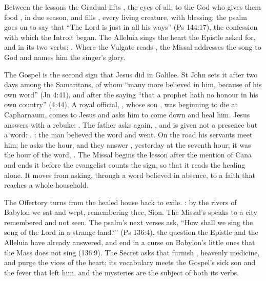Between the lessons the Gradual lifts , the eyes of all,
to the God who gives them
food , in due season, and fills , every living creature, with blessing; the psalm goes on to say that
``The Lord is just in all his ways'' (Ps 144:17), the confession with which the
Introit began. The Alleluia sings the heart the Epistle asked for, and in its
two verbs: . Where the Vulgate reads , the
Missal addresses the song to God and names him the singer's glory.

The Gospel is the second sign that Jesus did in Galilee. St John sets it after
two days among the Samaritans, of whom ``many more believed in him, because of
his own word'' (Jn 4:41), and after the saying ``that a prophet hath no honour
in his own country'' (4:44). A royal official, , whose son
, was beginning to die at Capharnaum, comes to Jesus and
asks him to come down and heal him. Jesus answers with a rebuke:
. The
father asks again, , and
is given not a presence but a word: .
: the man believed
the word and went. On the road his servants meet him; he asks the hour, and
they answer , yesterday at the seventh hour; it was
the hour of the word, . The Missal
begins the lesson after the mention of Cana and ends it before the evangelist
counts the sign, so that it reads the healing alone. It moves from asking, through a word believed in absence, to a faith that reaches
a whole household.

The Offertory turns from the healed house back to exile. : by the rivers
of Babylon we sat and wept, remembering thee, Sion. The Missal's 
speaks to a city remembered and not seen. The psalm's next verses ask, ``How shall we sing the song of the Lord in a
strange land?'' (Ps 136:4), the question the Epistle and the Alleluia have
already answered, and end in a curse on Babylon's little ones that the Mass
does not sing (136:9). The Secret asks that  furnish
, heavenly medicine, and purge the vices of
the heart; its vocabulary meets the Gospel's sick son and the fever that left
him, and the mysteries are the subject of both its verbs.

